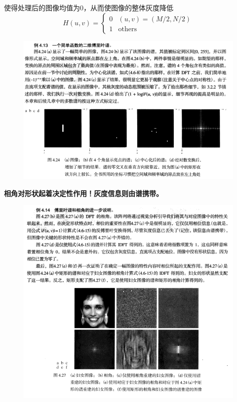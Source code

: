 \begin{example}
使得处理后的图像均值为0，从而使图像的整体灰度降低
\[H(u,v)=\begin{cases}
0 & (u,v)=(M/2,N/2)\\
1 & \text{others}
\end{cases}\]
\end{example}

\begin{figure}[H]
\centering
\includegraphics[width=\linewidth]{fig/fourier_spectrum.png}
\end{figure}

\textbf{相角对形状起着决定性作用！灰度信息则由谱携带。}
\begin{figure}[H]
\centering
\includegraphics[width=\linewidth]{fig/spectrum_angle_example.png}
\end{figure}


